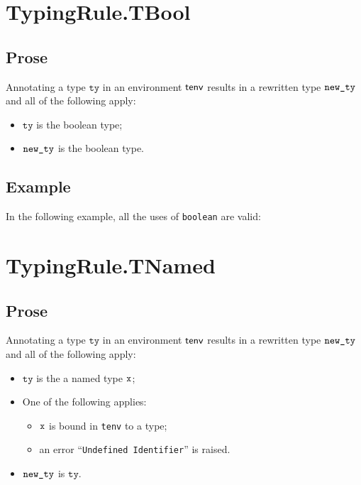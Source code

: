 \documentclass{book}
\newcommand\tty[0]{\texttt{ty}}
\begin{document}


\section{TypingRule.TBool \label{sec:TypingRule.TBool}}

\subsection{Prose}
Annotating a type $\tty$ in an environment $\textsf{tenv}$ results in a
rewritten type $\texttt{new\_ty}$ and all of the following apply:
\begin{itemize}
  \item $\tty$ is the boolean type;
  \item $\texttt{new\_ty}$ is the boolean type.
\end{itemize}

\subsection{Example}
In the following example, all the uses of \texttt{boolean} are valid:






\section{TypingRule.TNamed \label{sec:TypingRule.TNamed}}

\subsection{Prose}
Annotating a type $\tty$ in an environment $\textsf{tenv}$ results in a
rewritten type $\texttt{new\_ty}$ and all of the following apply:
\begin{itemize}
  \item $\tty$ is the a named type $\texttt{x}$;
  \item One of the following applies:
    \begin{itemize}
      \item $\texttt{x}$ is bound in \texttt{tenv} to a type;
      \item an error ``\texttt{Undefined Identifier}'' is raised.
    \end{itemize}
  \item $\texttt{new\_ty}$ is $\tty$.
\end{itemize}
\end{document}
